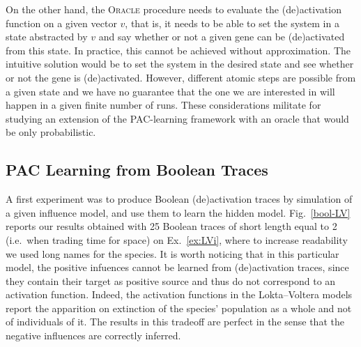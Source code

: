 \documentclass{llncs}
\begin{document}
On the other hand, the \textsc{Oracle} procedure needs to evaluate the (de)activation function on a given vector $v$, that is, it needs to be able to set the system in a state abstracted by $v$ and say whether or not a given gene can be (de)activated from this state.
In practice, this cannot be achieved without approximation.
The intuitive solution would be to set the system in the desired state and see whether or not the gene is (de)activated. 
However, different atomic steps are possible from a given state and we have no guarantee that the one we are interested in will happen in a given finite number of runs.
These considerations militate for studying an extension of the PAC-learning framework with an oracle that would be only probabilistic.



\subsection{PAC Learning from Boolean Traces}

A first experiment was to produce Boolean (de)activation traces by simulation of a given influence model, and use them to learn the hidden model.
Fig.~\ref{bool-LV} reports our results obtained with  25 Boolean traces of short length equal to 2 (i.e.~when trading time for space)
on Ex.~\ref{ex:LVi}, where to increase readability we used long names for the
species.
It is worth noticing that in this particular model, the positive infuences cannot be learned from (de)activation traces,
since they contain their target as positive source and thus do not correspond to an activation function.
Indeed, the activation functions in the Lokta--Voltera models report the apparition on extinction of the species' population as a whole and not of individuals of it.
The results in this tradeoff are perfect in the sense that the negative influences are correctly inferred.
\end{document}
